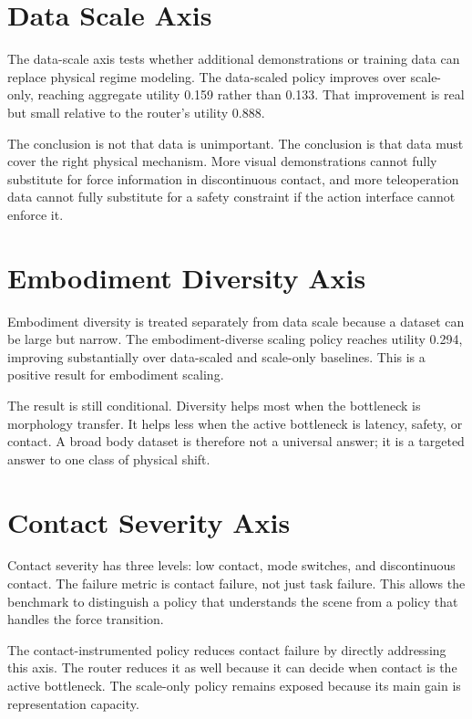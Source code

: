 \section{Data Scale Axis}

The data-scale axis tests whether additional demonstrations or training data can replace physical regime modeling. The data-scaled policy improves over scale-only, reaching aggregate utility 0.159 rather than 0.133. That improvement is real but small relative to the router's utility 0.888.

The conclusion is not that data is unimportant. The conclusion is that data must cover the right physical mechanism. More visual demonstrations cannot fully substitute for force information in discontinuous contact, and more teleoperation data cannot fully substitute for a safety constraint if the action interface cannot enforce it.

\section{Embodiment Diversity Axis}

Embodiment diversity is treated separately from data scale because a dataset can be large but narrow. The embodiment-diverse scaling policy reaches utility 0.294, improving substantially over data-scaled and scale-only baselines. This is a positive result for embodiment scaling.

The result is still conditional. Diversity helps most when the bottleneck is morphology transfer. It helps less when the active bottleneck is latency, safety, or contact. A broad body dataset is therefore not a universal answer; it is a targeted answer to one class of physical shift.

\section{Contact Severity Axis}

Contact severity has three levels: low contact, mode switches, and discontinuous contact. The failure metric is contact failure, not just task failure. This allows the benchmark to distinguish a policy that understands the scene from a policy that handles the force transition.

The contact-instrumented policy reduces contact failure by directly addressing this axis. The router reduces it as well because it can decide when contact is the active bottleneck. The scale-only policy remains exposed because its main gain is representation capacity.

